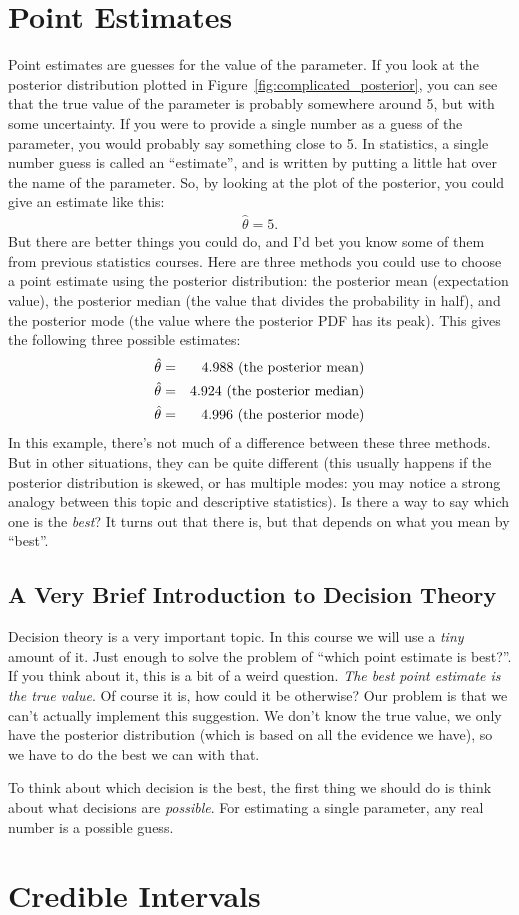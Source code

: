 \section{Point Estimates}
Point estimates are guesses for the value of the parameter. If you look at the
posterior distribution plotted in Figure~\ref{fig:complicated_posterior}, you
can see that the true value of the parameter is probably somewhere around 5,
but with some uncertainty. If you were to provide a single number as a guess of
the parameter, you would probably say something close to 5. In statistics, a
single number guess is called an ``estimate'', and is written by putting a
little hat over the name of the parameter. So, by looking at the plot of the
posterior, you could give an estimate like this:
\begin{eqnarray}
\hat{\theta} = 5.
\end{eqnarray}
But there are better things you could do, and I'd bet you know some of them
from previous statistics courses. Here are three methods you could use to
choose a point estimate using the posterior distribution: the posterior mean
(expectation value), the posterior median (the value that divides the probability
in half), and the posterior mode (the value where the posterior PDF has its
peak). This gives the following three possible estimates:
\begin{eqnarray}
\hat{\theta} &=& 4.988 \textnormal{ (the posterior mean)}\\
\hat{\theta} &=& 4.924 \textnormal{ (the posterior median)}\\
\hat{\theta} &=& 4.996 \textnormal{ (the posterior mode)}
\end{eqnarray}
In this example, there's not much of a difference between these three methods.
But in other situations, they can be quite different (this usually happens if
the posterior distribution is skewed, or has multiple modes: you may notice a
strong analogy between this topic and descriptive statistics). Is there a way
to say which one is the {\it best}? It turns out that there is, but that
depends on what you mean by ``best''.

\subsection{A Very Brief Introduction to Decision Theory}
Decision theory is a very important topic. In this course we will use a
{\it tiny} amount of it. Just enough to solve the problem of ``which point
estimate is best?''. If you think about it, this is a bit of a weird question.
{\it The best point estimate is the true value}. Of course it is, how could it
be otherwise? Our problem is that we can't actually implement this suggestion.
We don't know the true value, we only have the posterior distribution
(which is based on all the evidence we have), so we have to do 
the best we can with that.

To think about which decision is the best, the first thing we should do is think
about what decisions are {\it possible}. For estimating a single parameter, any
real number is a possible guess.










\section{Credible Intervals}



